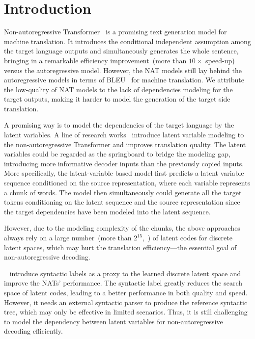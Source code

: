 \section{Introduction}
Non-autoregressive Transformer~\cite[NAT,][]{nat,nat_reg,iter_nat,cmlm} is a promising text generation model for machine translation. 
It introduces the conditional independent assumption among the target language outputs and simultaneously generates the whole sentence, bringing in a remarkable efficiency improvement~(more than $10\times$ speed-up) versus the autoregressive model. 
However, the NAT models still lay behind the autoregressive models in terms of BLEU~\citep{bleu} for machine translation. 
We attribute the low-quality of NAT models to the lack of dependencies modeling for the target outputs, making it harder to model the generation of the target side translation. %

A promising way is to model the dependencies of the target language by the latent variables. 
A line of research works~\cite{lt,vqvae,lv_nar,flowseq} introduce latent variable modeling to the non-autoregressive Transformer and improves translation quality. 
The latent variables could be regarded as the springboard to bridge the modeling gap, introducing more informative decoder inputs than the previously copied inputs. 
More specifically, the latent-variable based model first predicts a latent variable sequence conditioned on the source representation, where each variable represents a chunk of words. The model then simultaneously could generate all the target tokens conditioning on the latent sequence and the source representation since the target dependencies have been modeled into the latent sequence.

However, due to the modeling complexity of the chunks, the above approaches always rely on a large number~(more than $2^{15}$,~\citealp{lt,vqvae}) of latent codes for discrete latent spaces, which may hurt the translation efficiency---the essential goal of non-autoregressive decoding.



~\citet{syn_st} introduce syntactic labels as a proxy to the learned discrete latent space and improve the NATs' performance.  
The syntactic label greatly reduces the search space of latent codes, leading to a better performance in both quality and speed. However, it needs an external syntactic parser to produce the reference syntactic tree, which may only be effective in limited scenarios.
Thus, it is still challenging to model the dependency between latent variables for non-autoregressive decoding efficiently.%

